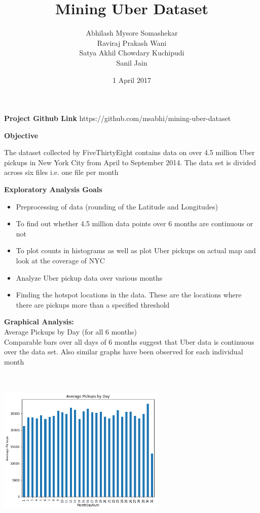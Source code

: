 \documentclass[12pt]{article}
\begin{document}
\begin{titlepage}
\title{Mining Uber Dataset}
\author{Abhilash Mysore Somashekar \\Raviraj Prakash Wani \\ Satya Akhil Chowdary Kuchipudi \\Sanil Jain}
\date{1 April 2017}
\maketitle
\end{titlepage}


\textbf{Project Github Link} https://github.com/msabhi/mining-uber-dataset \break

\textbf{Objective}

The dataset collected by FiveThirtyEight contains data on over 4.5 million Uber pickups in New York City from April to September 2014. The data set is divided across six files i.e. one file per month


\textbf{Exploratory Analysis Goals}

\begin{itemize}
	\item Preprocessing of data (rounding of the Latitude and Longitudes)
	\item To find out whether 4.5 million data points over 6 months are continuous or not
	\item To plot counts in histograms as well as plot Uber pickups on actual map and look at the coverage of NYC
	\item Analyze Uber pickup data over various months
	\item Finding the hotspot locations in the data. These are the locations where there are pickups more than a specified threshold
\end{itemize}


\textbf{Graphical Analysis:} \\

 Average Pickups by Day (for all 6 months) \\
  	Comparable bars over all days of 6 months suggest that Uber data is continuous over the data set. Also similar graphs have been observed for each individual month

\includegraphics[width=8cm, height=8cm]{ByDay.png}
\end{document}
